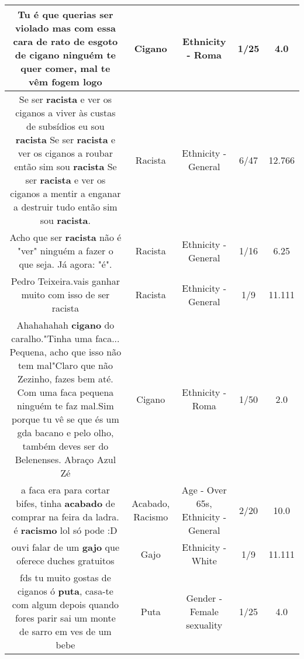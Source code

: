 \documentclass[11pt]{article}
\newlength\mylength
\begin{document}
\begin{center}
\begin{longtable}{|C{.65\mylength}|C{.30\mylength}|C{.12\mylength}|C{.12\mylength}|C{.12\mylength}|}
  \small Tu é que querias ser violado mas com essa cara de rato de esgoto de \textbf{cigano} ninguém te quer comer, mal te vêm fogem logo\normalsize   & Cigano & Ethnicity - Roma & 1/25 & 4.0 \\  \hline
  \small Se ser \textbf{racista} e ver os ciganos a viver às custas de subsídios eu sou \textbf{racista} Se ser \textbf{racista} e ver os ciganos a roubar então sim sou \textbf{racista} Se ser \textbf{racista} e ver os ciganos a mentir a enganar a destruir tudo então sim sou \textbf{racista}.\normalsize   & Racista & Ethnicity - General & 6/47 & 12.766 \\  \hline
  \small Acho que ser \textbf{racista} não é "ver" ninguém a fazer o que seja. Já agora: "é".\normalsize   & Racista & Ethnicity - General & 1/16 & 6.25 \\  \hline
  \small Pedro Teixeira.vais ganhar muito com isso de ser racista\normalsize   & Racista & Ethnicity - General & 1/9 & 11.111 \\  \hline
  \small Ahahahahah \textbf{cigano} do caralho."Tinha uma faca... Pequena, acho que isso não tem mal"Claro que não Zezinho, fazes bem até. Com uma faca pequena ninguém te faz mal.Sim porque tu vê se que és um gda bacano e pelo olho, também deves ser do Belenenses. Abraço Azul Zé\normalsize   & Cigano & Ethnicity - Roma & 1/50 & 2.0 \\  \hline
  \small a faca era para cortar bifes, tinha \textbf{acabado} de comprar na feira da ladra. é \textbf{racismo} lol só pode :D\normalsize   & Acabado, Racismo & Age - Over 65s, Ethnicity - General & 2/20 & 10.0 \\  \hline
  \small ouvi falar de um \textbf{gajo} que oferece duches gratuitos\normalsize   & Gajo & Ethnicity - White & 1/9 & 11.111 \\  \hline
  \small fds tu muito gostas de ciganos ó \textbf{puta}, casa-te com algum depois quando fores parir sai um monte de sarro em ves de um bebe\normalsize   & Puta & Gender - Female sexuality & 1/25 & 4.0 \\  \hline

\end{longtable}
\end{center}
\end{document}
